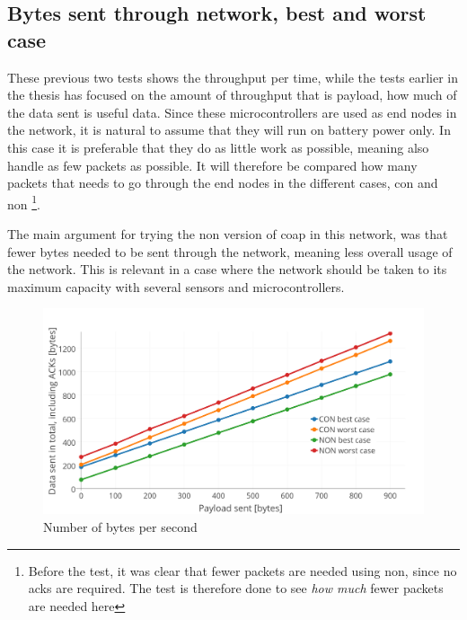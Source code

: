 
\newpage
\subsection{Bytes sent through network, best and worst case}

\noindent These previous two tests shows the throughput per time, while the tests earlier in the thesis has focused on the amount of throughput that is \gls{payload}, how much of the data sent is useful data. Since these \glspl{microcontroller} are used as end nodes in the network, it is natural to assume that they will run on battery power only. In this case it is preferable that they do as little work as possible, meaning also handle as few packets as possible. It will therefore be compared how many packets that needs to go through the end nodes in the different cases, \gls{con} and \gls{non} \footnote{Before the test, it was clear that fewer packets are needed using \gls{non}, since no \glspl{ack} are required. The test is therefore done to see \textit{how much} fewer packets are needed here}.

\noindent The main argument for trying the \gls{non} version of \gls{coap} in this network, was that fewer bytes needed to be sent through the network, meaning less overall usage of the network. This is relevant in a case where the network should be taken to its maximum capacity with several sensors and \glspl{microcontroller}. 

\begin{figure}[ht]
    \centering
    \includegraphics[width=1.0\textwidth]{bestCaseworstCase3.png}    
    \caption{Number of bytes per second}
    \label{fig:bestCaseworstCase}
\end{figure}

